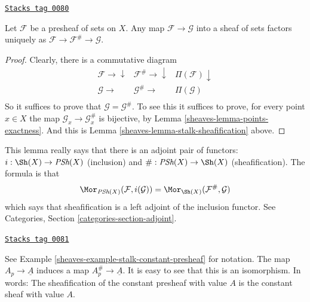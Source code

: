 \begin{lemma}
\label{sheaves-lemma-sheafify-universal}
\href{https://stacks.math.columbia.edu/tag/0080}{\texttt{Stacks tag 0080}}

Let $\mathcal{F}$ be a presheaf of sets on $X$.
Any map $\mathcal{F} \to \mathcal{G}$ into a sheaf of sets
factors uniquely as
$\mathcal{F} \to \mathcal{F}^\# \to \mathcal{G}$.
\end{lemma}

\begin{proof}

Clearly, there is a commutative diagram
$$
\begin{array}{ccc}\mathcal{F} \longrightarrow\downarrow & \mathcal{F}^\# \longrightarrow\downarrow & \Pi(\mathcal{F}) \downarrow \\ \mathcal{G} \longrightarrow & \mathcal{G}^\# \longrightarrow & \Pi(\mathcal{G}) \\  &  & \end{array}
$$
So it suffices to prove that $\mathcal{G} = \mathcal{G}^\#$.
To see this it suffices to prove, for every point $x \in X$ the
map $\mathcal{G}_x \to \mathcal{G}^\#_x$ is bijective, by
Lemma \ref{sheaves-lemma-points-exactness}. And this is
Lemma \ref{sheaves-lemma-stalk-sheafification} above.
\end{proof}

This lemma really says that there is an adjoint pair
of functors: $i : \Sh(X) \to \textit{PSh}(X)$
(inclusion) and $\# : \textit{PSh}(X) \to \Sh(X)$
(sheafification). The formula is that
$$
\Mor_{\textit{PSh}(X)}(\mathcal{F}, i(\mathcal{G}))
=
\Mor_{\Sh(X)}(\mathcal{F}^\#, \mathcal{G})
$$
which says that sheafification is a left adjoint of
the inclusion functor. See Categories, Section
\ref{categories-section-adjoint}.

\begin{example}
\label{sheaves-example-sheafify-constant}
\href{https://stacks.math.columbia.edu/tag/0081}{\texttt{Stacks tag 0081}}

See Example \ref{sheaves-example-stalk-constant-presheaf} for notation.
The map $A_p \to \underline{A}$ induces a map
$A_p^\# \to \underline{A}$. It is easy to see that this
is an isomorphism. In words: The sheafification
of the constant presheaf with value $A$ is the
constant sheaf with value $A$.
\end{example}

